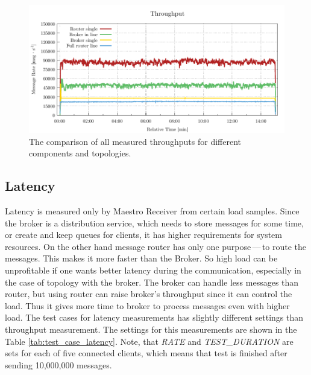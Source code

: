 \begin{figure}[H]
	\centering
	\includegraphics[width=1\linewidth]{obrazky-figures/charts/basic-throughput.pdf}
	\caption{The comparison of all measured throughputs for different components and topologies.}
	\label{fig:basic-throughput-comparison}
\end{figure}


\subsection{Latency}
\label{Latency}
Latency is measured only by Maestro Receiver from certain load samples. Since the broker is a distribution service, which needs to store messages for some time, or create and keep queues for clients, it has higher requirements for system resources. On the other hand message router has only one purpose\,---\,to route the messages. This makes it more faster than the Broker. So high load can be unprofitable if one wants better latency during the communication, especially in the case of topology with the broker. The broker can handle less messages than router, but using router can raise broker's throughput since it can control the load. Thus it gives more time to broker to process messages even with higher load. The test cases for latency measurements has slightly different settings than throughput measurement. The settings for this measurements are shown in the Table \ref{tab:test_case_latency}. Note, that \emph{RATE} and \emph{TEST\_DURATION} are sets for each of five connected clients, which means that test is finished after sending 10,000,000 messages.

